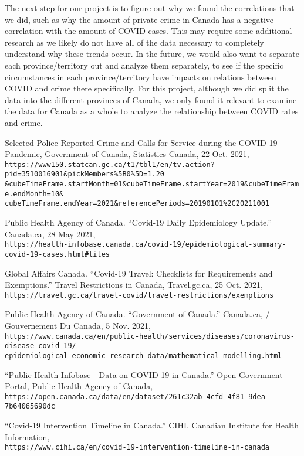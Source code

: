 \documentclass[fontsize=11pt]{article}
\newcommand{\quotes}[1]{``#1''}
\begin{document}
The next step for our project is to figure out why we found the correlations that we did, such as why the amount of private crime in Canada has a negative correlation with the amount of COVID cases. This may require some additional research as we likely do not have all of the data necessary to completely understand why these trends occur. In the future, we would also want to separate each province/territory out and analyze them separately, to see if the specific circumstances in each province/territory have impacts on relations between COVID and crime there specifically. For this project, although we did split the data into the different provinces of Canada, we only found it relevant to examine the data for Canada as a whole to analyze the relationship between COVID rates and crime.

\begin{thebibliography}{9}
	Selected Police-Reported Crime and Calls for Service during the COVID-19 Pandemic, Government of Canada, Statistics Canada, 22 Oct. 2021, \\
	\verb+https://www150.statcan.gc.ca/t1/tbl1/en/tv.action?pid=3510016901&pickMembers%5B0%5D=1.20+\\
	\verb+&cubeTimeFrame.startMonth=01&cubeTimeFrame.startYear=2019&cubeTimeFrame.endMonth=10&+\\
	\verb+cubeTimeFrame.endYear=2021&referencePeriods=20190101%2C20211001+

	Public Health Agency of Canada. \quotes{Covid-19 Daily Epidemiology Update.} Canada.ca, 28 May 2021,\\
	\verb+https://health-infobase.canada.ca/covid-19/epidemiological-summary-covid-19-cases.html#tiles+

	Global Affairs Canada. \quotes{Covid-19 Travel: Checklists for Requirements and Exemptions.} Travel Restrictions in Canada,  Travel.gc.ca, 25 Oct. 2021,\\
	\verb+https://travel.gc.ca/travel-covid/travel-restrictions/exemptions+

	Public Health Agency of Canada. \quotes{Government of Canada.} Canada.ca, / Gouvernement Du Canada, 5 Nov. 2021,\\
	\verb+https://www.canada.ca/en/public-health/services/diseases/coronavirus-disease-covid-19/+\\
	\verb+epidemiological-economic-research-data/mathematical-modelling.html+

	\quotes{Public Health Infobase - Data on COVID-19 in Canada.} Open Government Portal, Public Health Agency of Canada,\\
	\verb+https://open.canada.ca/data/en/dataset/261c32ab-4cfd-4f81-9dea-7b64065690dc+

	\quotes{Covid-19 Intervention Timeline in Canada.} CIHI, Canadian Institute for Health Information,\\
	\verb+https://www.cihi.ca/en/covid-19-intervention-timeline-in-canada+



\end{thebibliography}
\end{document}
